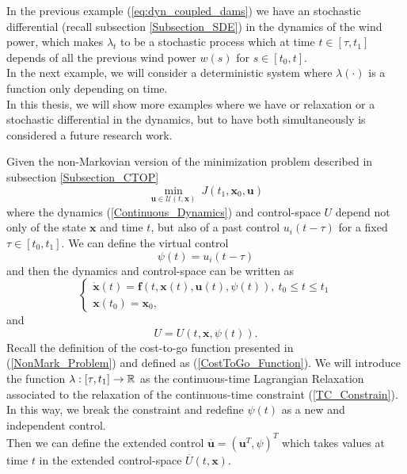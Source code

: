 In the previous example (\ref{eq:dyn_coupled_dams}) we have an stochastic differential (recall subsection \ref{Subsection_SDE}) in the dynamics of the wind power, which makes $\lambda_t$ to be a stochastic process which at time $t\in[\tau,t_1]$ depends of all the previous wind power $w(s)$ for $s\in[t_0,t]$.\\
In the next example, we will consider a deterministic system where $\lambda(\cdot)$ is a function only depending on time.\\
In this thesis, we will show more examples where we have or relaxation or a stochastic differential in the dynamics, but to have both simultaneously is considered a future research work.

\begin{example} \label{eq2}
Given the non-Markovian version of the minimization problem described in 
subsection \ref{Subsection_CTOP}
\begin{equation}
\min_{\bm{u}\in\mathcal{U}(t,\bm{x})}\ J(t_1,\bm{x}_0,\bm{u})
\label{NonMark_Problem}
\end{equation}
where the dynamics (\ref{Continuous_Dynamics}) and control-space $U$ 
depend not only of the state $\bm{x}$ and time $t$, but also of 
a past control $u_i(t-\tau)$ for a fixed $\tau\in[t_0,t_1]$. We can define the virtual 
control
\begin{equation}
\psi(t)=u_i(t-\tau)
\label{TC_Constrain}
\end{equation}
and then the dynamics and control-space can be written as
\begin{equation}
\begin{cases}
\dot{\bm{x}}(t)=\bm{f}(t,\bm{x}(t),\bm{u}(t),\psi(t)),\ t_0\leq t\leq t_1\\
\bm{x}(t_0)=\bm{x}_0,
\end{cases}
\end{equation}
and
\begin{equation}
U=U(t,\bm{x},\psi(t)).
\end{equation}
Recall the definition of the cost-to-go function presented in  (\ref{NonMark_Problem}) 
and defined as (\ref{CostToGo_Function}). We will introduce the function 
$\lambda:[\tau,t_1]\to\mathbb{R}$ as the continuous-time Lagrangian Relaxation associated 
to the relaxation of the continuous-time constraint (\ref{TC_Constrain}). In this 
way, we break the constraint and redefine $\psi(t)$ as a new and independent control.\\
Then we can define the extended control $\overline{\bm{u}}=(\bm{u}^T,\psi)^T$ which 
takes values at time $t$ in the extended control-space $\overline{U}(t,\bm{x})$. 

\end{example}
